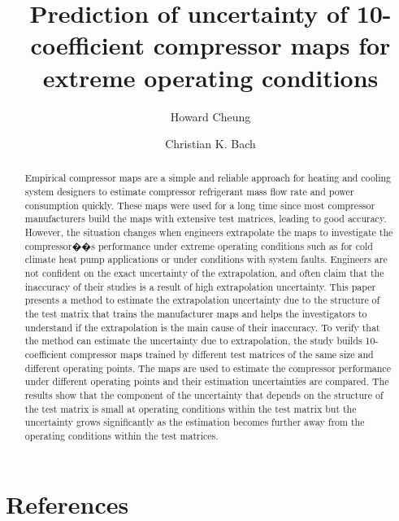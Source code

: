 \documentclass[a4paper]{jpconf}
\begin{document}
\title{Prediction of uncertainty of 10-coefficient compressor maps for extreme operating conditions}

\author{Howard Cheung}

\address{Postdoctoral Research Fellow, Ray W. Herrick Laboratories, School of Mechanical Engineering, Purdue University, 177 S. Russell St., West Lafayette, IN 47907-2031, US}


\author{Christian K. Bach}

\address{Assistant Professor, Mechanical and Aerospace Engineering, Oklahoma State University, 218 Engineering North, Stillwater, OK 74078-5016}


\begin{abstract}
Empirical compressor maps are a simple and reliable approach for heating and cooling system designers to estimate compressor refrigerant mass flow rate and power consumption quickly. These maps were used for a long time since most compressor manufacturers build the maps with extensive test matrices, leading to good accuracy. However, the situation changes when engineers extrapolate the maps to investigate the compressor��s performance under extreme operating conditions such as for cold climate heat pump applications or under conditions with system faults.  Engineers are not confident on the exact uncertainty of the extrapolation, and often claim that the inaccuracy of their studies is a result of high extrapolation uncertainty. This paper presents a method to estimate the extrapolation uncertainty due to the structure of the test matrix that trains the manufacturer maps and helps the investigators to understand if the extrapolation is the main cause of their inaccuracy. To verify that the method can estimate the uncertainty due to extrapolation, the study builds 10-coefficient compressor maps trained by different test matrices of the same size and different operating points. The maps are used to estimate the compressor performance under different operating points and their estimation uncertainties are compared. The results show that the component of the uncertainty that depends on the structure of the test matrix is small at operating conditions within the test matrix but the uncertainty grows significantly as the estimation becomes further away from the operating conditions within the test matrices.
\end{abstract}








\section*{References}

\end{document}
